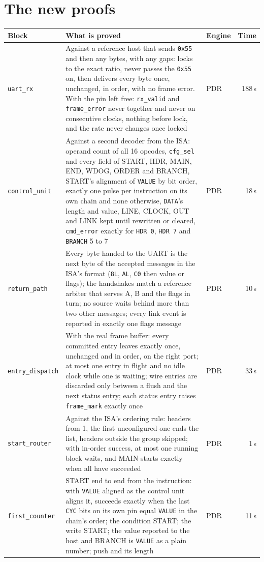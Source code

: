 \documentclass[11pt,a4paper]{article}
\newcommand{\sig}[1]{\texttt{#1}}
\begin{document}
\section{The new proofs}\label{sec:new}

\begin{center}\small
\begin{tabularx}{\linewidth}{@{}l L l r@{}}
\toprule
Block & What is proved & Engine & Time \\
\midrule
\sig{uart\_rx} & Against a reference host that sends \texttt{0x55} and then any bytes, with any gaps: locks to the exact ratio, never passes the \texttt{0x55} on, then delivers every byte once, unchanged, in order, with no frame error. With the pin left free: \sig{rx\_valid} and \sig{frame\_error} never together and never on consecutive clocks, nothing before lock, and the rate never changes once locked & PDR & 188\,s \\
\sig{control\_unit} & Against a second decoder from the ISA: operand count of all 16 opcodes, \sig{cfg\_sel} and every field of START, HDR, MAIN, END, WDOG, ORDER and BRANCH, START's alignment of \sig{VALUE} by bit order, exactly one pulse per instruction on its own chain and none otherwise, \sig{DATA}'s length and value, LINE, CLOCK, OUT and LINK kept until rewritten or cleared, \sig{cmd\_error} exactly for \sig{HDR 0}, \sig{HDR 7} and \sig{BRANCH} 5 to 7 & PDR & 18\,s \\
\sig{return\_path} & Every byte handed to the UART is the next byte of the accepted messages in the ISA's format (\texttt{8L}, \texttt{AL}, \texttt{C0} then value or flags); the handshakes match a reference arbiter that serves A, B and the flags in turn; no source waits behind more than two other messages; every link event is reported in exactly one flags message & PDR & 10\,s \\
\sig{entry\_dispatch} & With the real frame buffer: every committed entry leaves exactly once, unchanged and in order, on the right port; at most one entry in flight and no idle clock while one is waiting; wire entries are discarded only between a flush and the next status entry; each status entry raises \sig{frame\_mark} exactly once & PDR & 33\,s \\
\sig{start\_router} & Against the ISA's ordering rule: headers from 1, the first unconfigured one ends the list, headers outside the group skipped; with in-order success, at most one running block waits, and MAIN starts exactly when all have succeeded & PDR & 1\,s \\
\sig{first\_counter} & START end to end from the instruction: with \sig{VALUE} aligned as the control unit aligns it, succeeds exactly when the last \sig{CYC} bits on its own pin equal \sig{VALUE} in the chain's order; the condition START; the write START; the value reported to the host and BRANCH is \sig{VALUE} as a plain number; push and its length & PDR & 11\,s \\

\end{tabularx}
\end{center}
\end{document}
